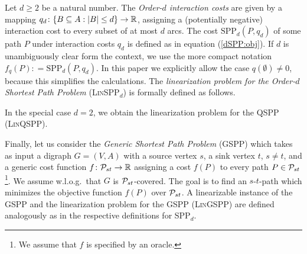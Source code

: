 Let $d \geq 2$ be a natural number. The \emph{Order-$d$ interaction costs} are given by a mapping $q_d\colon \{ B \subseteq A : |B| \leq d \}\to \mathbb{R}$, assigning a (potentially negative) interaction cost to every subset of at most $d$ arcs.
The cost $\text{SPP}_d(P,q_d)$ of some path $P$ under interaction costs $q_d$ is defined as in equation (\ref{dSPP:obj}).
If $d$ is unambiguously clear form the context, we use the  more compact notation $f_q(P): = \text{SPP}_d(P,q_d)$.
 In this paper we explicitly allow the case $q(\emptyset) \neq 0$, because this simplifies the calculations.  
The \emph{linearization problem for the Order-$d$ Shortest Path Problem} (\textsc{Lin}SPP$_d$)
is formally defined as follows.
\begin{center}
\end{center}
In the special case $d = 2$, we obtain the    linearization problem for the QSPP (\textsc{Lin}QSPP).
\smallskip

Finally, let us consider the \emph{Generic Shortest Path Problem} (GSPP) which takes as input  a digraph $G=(V,A)$ with a source vertex $s$, a sink vertex $t$, $s\neq t$, and a generic cost function $f\colon \mathcal{P}_{st} \to \mathbb{R}$  assigning  a cost $f(P)$ to every path $P\in \mathcal{P}_{st}$\footnote{We assume that $f$ is specified by an oracle.}. We assume w.l.o.g.\ that $G$ is $\mathcal{P}_{st}$-covered. The goal is to find an $s$-$t$-path  which minimizes the objective function $f(P)$ over $\mathcal{P}_{st}$. 
A linearizable instance of  the GSPP and the linearization problem for the GSPP (\textsc{Lin}GSPP) are  defined analogously as in the respective definitions for SPP$_d$.



